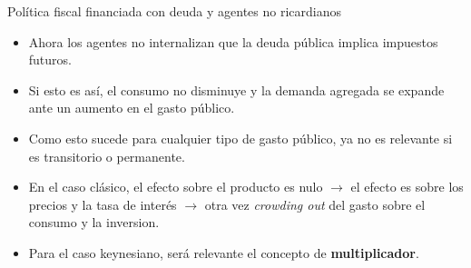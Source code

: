 \documentclass{beamer}
\begin{document}
\begin{frame}{Política fiscal financiada con deuda y agentes no ricardianos}
    \begin{itemize}
        \item Ahora los agentes no internalizan que la deuda pública implica impuestos futuros.
        \item Si esto es así, el consumo no disminuye y la demanda agregada se expande ante un aumento en el gasto público.
        \item Como esto sucede para cualquier tipo de gasto público, ya no es relevante si es transitorio o permanente.
        \item En el caso clásico, el efecto sobre el producto es nulo $\rightarrow$ el efecto es sobre los precios y la tasa de interés $\rightarrow$ otra vez \textit{crowding out} del gasto sobre el consumo y la inversion.
        \item Para el caso keynesiano, será relevante el concepto de \textbf{multiplicador}.
    \end{itemize}
\end{frame}
\end{document}
